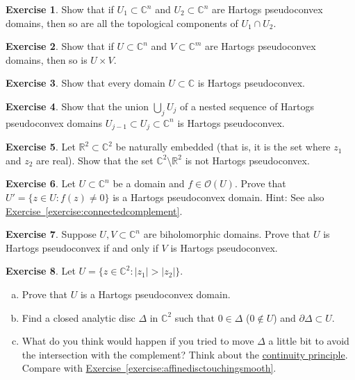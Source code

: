 \documentclass[12pt,openany]{book}
\newcommand{\sabs}[1]{\lvert {#1} \rvert}
\newcommand{\C}{{\mathbb{C}}}
\newcommand{\R}{{\mathbb{R}}}
\newcommand{\sO}{{\mathscr{O}}}
\theoremstyle{plain}
\theoremstyle{remark}
\theoremstyle{definition}
\newenvironment{exbox}{%
    \def\FrameCommand{\vrule width 1pt \relax\hspace{10pt}}%
    \MakeFramed {\advance \hsize -\width \FrameRestore}%
}{%
    \endMakeFramed
}
\newenvironment{exparts}{%
    \leavevmode\begin{enumerate}[a),noitemsep,topsep=0pt,parsep=0pt,partopsep=0pt]
}{%
    \end{enumerate}
}
\theoremstyle{exercise}
\newtheorem{exercise}{Exercise}[section]
\theoremstyle{example}
\newcommand{\exerciseref}[1]{\hyperref[#1]{Exercise~\ref*{#1}}}
\begin{document}
\begin{exbox}
\begin{exercise}
Show that if $U_1 \subset \C^n$ and $U_2 \subset \C^n$ are Hartogs
pseudoconvex domains, then so are all the topological components of $U_1 \cap U_2$.
\end{exercise}

\begin{exercise}
Show that if $U \subset \C^n$ and $V \subset \C^m$ are Hartogs
pseudoconvex domains, then so is $U \times V$.
\end{exercise}

\begin{exercise}
Show that every domain $U \subset \C$ is Hartogs pseudoconvex.
\end{exercise}

\begin{exercise} \label{exercise:nestedunions}
Show that the union $\bigcup_j U_j$ of a nested sequence of Hartogs pseudoconvex
domains $U_{j-1} \subset U_j \subset \C^n$ is Hartogs pseudoconvex.
\end{exercise}

\begin{exercise}
Let $\R^2 \subset \C^2$ be naturally embedded (that is, it is the
set where $z_1$ and $z_2$ are real).  Show that the set $\C^2 \setminus
\R^2$ is not Hartogs pseudoconvex.
\end{exercise}

\begin{exercise}
Let $U \subset \C^n$ be a domain and $f \in \sO(U)$.  Prove that
$U' = \bigl\{ z \in U : f(z) \not= 0 \bigr\}$ is a Hartogs pseudoconvex
domain.  Hint: See also \exerciseref{exercise:connectedcomplement}.
\end{exercise}

\begin{exercise} \label{exercise:biholHartogs}
Suppose $U,V \subset \C^n$ are biholomorphic domains.
Prove that $U$ is Hartogs pseudoconvex if and only if $V$ is
Hartogs pseudoconvex.
\end{exercise}

\begin{exercise}
Let $U = \bigl\{ z \in \C^2 : \sabs{z_1} > \sabs{z_2} \bigr\}$.
\begin{exparts}
\item
Prove that $U$ is a Hartogs pseudoconvex domain.
\item
Find a closed analytic disc $\Delta$ in $\C^2$ such that $0 \in \Delta$ ($0
\notin U$)
and $\partial \Delta \subset U$.
\item
What do you think would happen if you tried to move $\Delta$ a
little bit to avoid the intersection with the complement?
Think about the \hyperref[thm:contprinciple]{continuity principle}.
Compare with \exerciseref{exercise:affinedisctouchingsmooth}.
\end{exparts}
\end{exercise}


\end{exbox}
\end{document}
